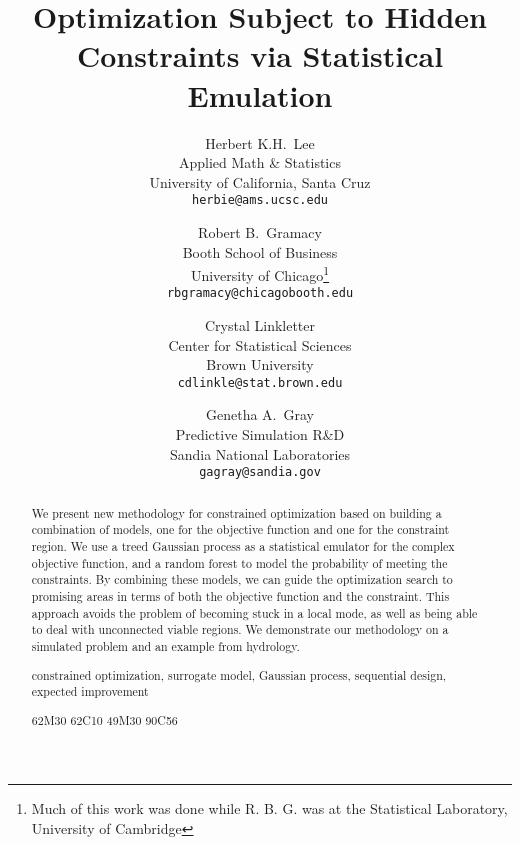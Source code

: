 \documentclass[12pt]{article}
\begin{document}
\title{Optimization Subject to Hidden Constraints via Statistical Emulation}
\author{
  Herbert K.H.~Lee\\
  Applied Math \& Statistics\\
  University of California, Santa Cruz\\
  {\tt herbie@ams.ucsc.edu} \and
  Robert B.~Gramacy\\
  Booth School of Business\\
  University of Chicago\footnote{Much of this work was done while
    R. B. G. was at the Statistical Laboratory, University of Cambridge}\\
  {\tt rbgramacy@chicagobooth.edu} \and
  Crystal Linkletter\\
  Center for Statistical Sciences\\
  Brown University\\
  {\tt cdlinkle@stat.brown.edu} \and
  Genetha A.~Gray\\
  Predictive Simulation R\&D\\
  Sandia National Laboratories\\
  {\tt gagray@sandia.gov}}

\maketitle

\begin{abstract}
\noindent
We present new methodology for constrained optimization based on
building a combination of models, one for the objective function and
one for the constraint region.  We use a treed Gaussian process as a
statistical emulator for the complex objective function, and a random
forest to model the probability of meeting the constraints.  By
combining these models, we can guide the optimization search to
promising areas in terms of both the objective function and the
constraint.  This approach avoids the problem of becoming stuck in a
local mode, as well as being able to deal with unconnected viable
regions.  We demonstrate our methodology on a simulated problem and an
example from hydrology.

\bigskip
{} constrained optimization, surrogate
model, Gaussian process, sequential design, expected improvement

\bigskip
{}  62M30 62C10 49M30 90C56
\end{abstract}

\renewcommand{\baselinestretch}{1.9}\small\normalsize
\end{document}
